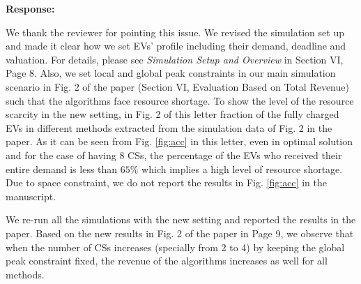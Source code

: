 \documentclass[11pt]{article}
\begin{document}
\vspace{5mm}
\noindent\textbf{Response:}

We thank the reviewer for pointing this issue.
We revised the simulation set up and made it clear how we set EVs' profile including their demand, deadline and valuation. For details, please see \emph{Simulation Setup and Overview} in Section VI, Page 8. Also, we set local and global peak constraints in our main simulation scenario in Fig. 2 of the paper (Section VI, Evaluation Based on Total Revenue) such that the algorithms face resource shortage. To show the level of the resource scarcity in the new setting, in Fig. 2 of this letter fraction of the fully charged EVs in different methods extracted from the simulation data of Fig. 2 in the paper. As it can be seen from Fig. \ref{fig:acc} in this letter,
even in optimal solution and for the case of having $8$ CSs, the percentage of the EVs who received their entire demand is less than $65\%$ which implies a high level of resource shortage. Due to space constraint, we do not report the results in Fig. \ref{fig:acc} in the manuscript.

We re-run all the simulations with the new setting and reported the results in the paper. Based on the new results in Fig. 2 of the paper in Page 9, we observe that when the number of CSs increases (specially from 2 to 4) by keeping the global peak constraint fixed, the revenue of the algorithms increases as well for all methods.
\end{document}

